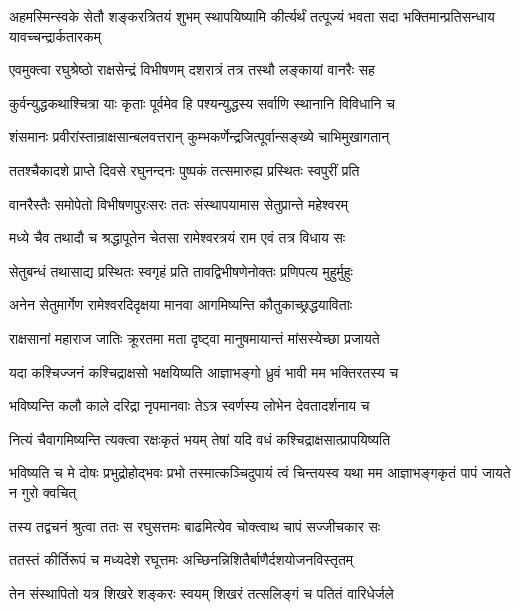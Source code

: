 \threelineshloka
{अहमस्मिन्स्वके सेतौ शङ्करत्रितयं शुभम्}
{स्थापयिष्यामि कीर्त्यर्थं तत्पूज्यं भवता सदा}
{भक्तिमान्प्रतिसन्धाय यावच्चन्द्रार्कतारकम्}%

\twolineshloka
{एवमुक्त्वा रघुश्रेष्ठो राक्षसेन्द्रं विभीषणम्}
{दशरात्रं तत्र तस्थौ लङ्कायां वानरैः सह}%

\twolineshloka
{कुर्वन्युद्धकथाश्चित्रा याः कृताः पूर्वमेव हि}
{पश्यन्युद्धस्य सर्वाणि स्थानानि विविधानि च}%

\twolineshloka
{शंसमानः प्रवीरांस्तान्राक्षसान्बलवत्तरान्}
{कुम्भकर्णेन्द्रजित्पूर्वान्सङ्ख्ये चाभिमुखागतान्}%

\twolineshloka
{ततश्चैकादशे प्राप्ते दिवसे रघुनन्दनः}
{पुष्पकं तत्समारुह्य प्रस्थितः स्वपुरीं प्रति}%

\twolineshloka
{वानरैस्तैः समोपेतो विभीषणपुरःसरः}
{ततः संस्थापयामास सेतुप्रान्ते महेश्वरम्}%

\twolineshloka
{मध्ये चैव तथादौ च श्रद्धापूतेन चेतसा}
{रामेश्वरत्रयं राम एवं तत्र विधाय सः}%

\twolineshloka
{सेतुबन्धं तथासाद्य प्रस्थितः स्वगृहं प्रति}
{तावद्विभीषणेनोक्तः प्रणिपत्य मुहुर्मुहुः}%


\twolineshloka
{अनेन सेतुमार्गेण रामेश्वरदिदृक्षया}
{मानवा आगमिष्यन्ति कौतुकाच्छ्रद्धयाविताः}%

\twolineshloka
{राक्षसानां महाराज जातिः क्रूरतमा मता}
{दृष्ट्वा मानुषमायान्तं मांसस्येच्छा प्रजायते}%

\twolineshloka
{यदा कश्चिज्जनं कश्चिद्राक्षसो भक्षयिष्यति}
{आज्ञाभङ्गो ध्रुवं भावी मम भक्तिरतस्य च}%

\twolineshloka
{भविष्यन्ति कलौ काले दरिद्रा नृपमानवाः}
{तेऽत्र स्वर्णस्य लोभेन देवतादर्शनाय च}%

\twolineshloka
{नित्यं चैवागमिष्यन्ति त्यक्त्वा रक्षःकृतं भयम्}
{तेषां यदि वधं कश्चिद्राक्षसात्प्रापयिष्यति}%

\threelineshloka
{भविष्यति च मे दोषः प्रभुद्रोहोद्भवः प्रभो}
{तस्मात्कञ्चिदुपायं त्वं चिन्तयस्व यथा मम}
{आज्ञाभङ्गकृतं पापं जायते न गुरो क्वचित्}%

\twolineshloka
{तस्य तद्वचनं श्रुत्वा ततः स रघुसत्तमः}
{बाढमित्येव चोक्त्वाथ चापं सज्जीचकार सः}%

\twolineshloka
{ततस्तं कीर्तिरूपं च मध्यदेशे रघूत्तमः}
{अच्छिनन्निशितैर्बाणैर्दशयोजनविस्तृतम्}%

\twolineshloka
{तेन संस्थापितो यत्र शिखरे शङ्करः स्वयम्}
{शिखरं तत्सलिङ्गं च पतितं वारिधेर्जले}%


